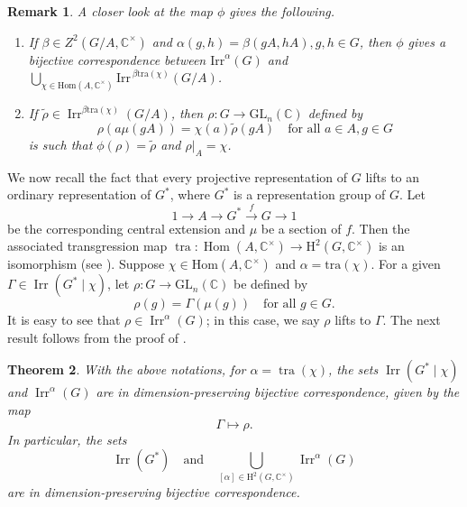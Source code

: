 \documentclass[a4paper,11pt]{amsart}
\numberwithin{equation}{section}
\numberwithin{equation}{subsection}
\newtheorem{theorem}{Theorem}[section]
\newtheorem{remark}[theorem]{Remark}
\newcommand{\C}{\mathbb{C}}
\begin{document}
	\begin{remark} \label{remark for bijective correspondence via inflation}
		A closer look at the map $\phi$  gives the following.
		\begin{enumerate}
			\item  If \(\beta \in Z^{2}(G/A,\C^{\times})\) and $\alpha(g,h) = \beta(gA,hA), g,h \in G$, then $\phi$ gives a bijective correspondence between \(\mathrm{Irr}^{\alpha}(G)\) and
			$\bigcup_{\chi \in \mathrm{Hom}(A,\C^{\times})}
			\mathrm{Irr}^{\,\beta\mathrm{tra}(\chi)}(G/A)$.
			
			\item If $\tilde{\rho} \in \operatorname{Irr}^{\beta \mathrm{tra}(\chi)}(G/A)$, then $\rho : G \to \mathrm{GL}_n(\C)$ defined by
			\[
			\rho(a \mu(gA)) = \chi(a)\tilde{\rho}(gA) \quad \text{for all } a \in A, g \in G  
			\] is such that $\phi(\rho) = \tilde{\rho}$ and $\rho |_A=\chi$.
		\end{enumerate}
	\end{remark}
	We now recall the fact that every projective representation of $G$ lifts to an ordinary representation of $G^{*}$, where $G^*$ is a representation group of $G$. Let 
	$$1 \longrightarrow A \longrightarrow G^* \xrightarrow{f} G \longrightarrow 1$$
	be the corresponding central extension and $\mu$ be a section of $f$. Then the associated transgression map
	$
	\operatorname{tra} : \operatorname{Hom}(A, \mathbb{C}^{\times}) \longrightarrow 
	\mathrm{H}^{2}(G, \mathbb{C}^{\times})
	$
	is an isomorphism (see \cite [Theorem 2.1.4]{schurmultiplier}).
	Suppose $\chi \in \mathrm{Hom}(A, \mathbb{C}^{\times})$ and  $\alpha= \mathrm{tra}(\chi)$. For a given $\Gamma \in \operatorname{Irr}(G^* \mid \chi)$, let $\rho : G \to \mathrm{GL}_n(\C)$ be defined by
	\[
	\rho(g) = \Gamma(\mu(g)) \quad \text{for all }g \in G.
	\]
	It is easy to see that $\rho \in \operatorname{Irr}^{\alpha}(G)$; in this case, we say $\rho$ lifts to $\Gamma$.
	The next result follows from the proof of \cite[Chapter 4, Lemma 1.2]{karpilovsky3}. 
	
	\begin{theorem} \label{bijective correspondence}
		With the above notations, for $\alpha = \operatorname{tra}(\chi)$, the sets $\operatorname{Irr}(G^{*} \mid \chi)$ and $\operatorname{Irr}^{\alpha}(G)$ are in dimension-preserving bijective correspondence, given by the map
		\[
		\Gamma \longmapsto \rho.
		\]
		In particular, the sets
		\[
		\operatorname{Irr}(G^{*})
		\quad \text{and} \quad \bigcup_{[\alpha] \in \mathrm{H}^{2}(G, \mathbb{C}^{\times})}
		\operatorname{Irr}^{\alpha}(G)
		\] are in dimension-preserving bijective correspondence. 
	\end{theorem}
	
\end{document}
